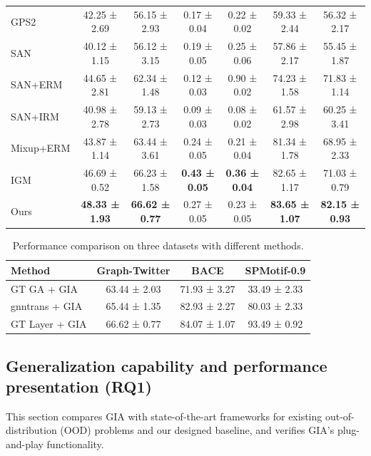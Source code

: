 \documentclass[a4paper,fleqn]{cas-dc}
\begin{document}
\begin{table}
\begin{tabular*}{\tblwidth}{@{}LCCCCCC@{}}
{\color{blue}GPS2\cite{rampavsek2022recipe} }               & 42.25 ± 2.69   & 56.15 ± 2.93   & 0.17 ± 0.04   & 0.22 ± 0.02 & 59.33 ± 2.44 & 56.32 ± 2.17 \\
{\color{blue}SAN\cite{kreuzer2021rethinking}}              & 40.12 ± 1.15 & 56.12 ± 3.15 & 0.19 ± 0.05 & 0.25 ± 0.06 & 57.86 ± 2.17 & 55.45 ± 1.87 \\
{\color{blue}SAN+ERM }                         & 44.65 ± 2.81  & 62.34 ± 1.48 & 0.12 ± 0.03 & 0.90 ± 0.02 & 74.23 ± 1.58 & 71.83 ± 1.14 \\
{\color{blue}SAN+IRM }                     & 40.98 ± 2.78 & 59.13 ± 2.73 & 0.09 ± 0.03 & 0.08 ± 0.02 & 61.57 ± 2.98 & 60.25 ± 3.41 \\
{\color{blue}Mixup+ERM\cite{wang2021mixup} }                  & 43.87 ± 1.14 & 63.44 ± 3.61 & 0.24 ± 0.05   & 0.21 ± 0.04 & 81.34 ± 1.78 & 68.95 ± 2.33 \\
IGM\cite{jia2024graph}            & 46.69 ± 0.52 & 66.23 ± 1.58 & \textbf{0.43 ± 0.05} & \textbf{0.36 ± 0.04} & 82.65 ± 1.17 & 71.03 ± 0.79 \\
Ours           & \textbf{48.33 ± 1.93} & \textbf{66.62 ± 0.77} & 0.27 ± 0.05 & 0.23 ± 0.05 & \textbf{83.65 ± 1.07} & \textbf{82.15 ± 0.93} \\
\bottomrule
\end{tabular*}
\end{table}

\begin{table}%
\caption{Performance comparison on three datasets with different methods.}
\label{tbl5}
\begin{tabular*}{\tblwidth}{@{}LCCC@{}}
\toprule
\textbf{Method} & \textbf{Graph-Twitter} & \textbf{BACE} & \textbf{SPMotif-0.9} \\
\midrule
GT GA + GIA & 63.44 ± 2.03 & 71.93 ± 3.27 & 33.49 ± 2.33 \\
gnntrans + GIA      & 65.44 ± 1.35 & 82.93 ± 2.27 & 80.03 ± 2.33 \\
GT Layer + GIA      & 66.62 ± 0.77 & 84.07 ± 1.07 & 93.49 ± 0.92 \\
\bottomrule
\end{tabular*}
\end{table}

\subsection{Generalization capability and performance presentation (RQ1)}
This section compares GIA with state-of-the-art frameworks for existing out-of-distribution (OOD) problems and our designed baseline, and verifies GIA's plug-and-play functionality.
\end{document}

